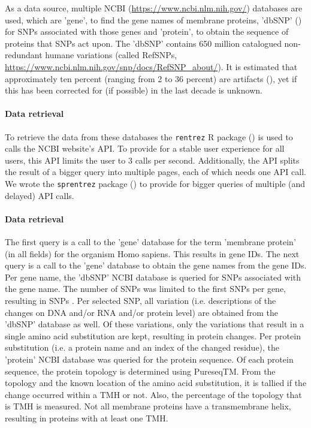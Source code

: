 As a data source, multiple
NCBI (\url{https://www.ncbi.nlm.nih.gov/}) databases are used,
which are 'gene', to find the gene names of membrane proteins, 
'dbSNP' (\cite{sherry2001dbsnp}) for SNPs associated with those genes
and 'protein', to obtain the sequence of proteins that SNPs act upon.
The 'dbSNP' contains 650 million 
catalogued non-redundant humane variations (called RefSNPs,
\url{https://www.ncbi.nlm.nih.gov/snp/docs/RefSNP_about/}).
It is estimated that approximately ten percent (ranging from 2 to 36 percent) 
are artifacts (\cite{carlson2003additional, cutler2001high, gabriel2002structure, mitchell2004discrepancies, musumeci2010single, reich2003quality}),
yet if this has been corrected for (if possible) in the last decade is unknown.

\paragraph{Data retrieval}

To retrieve the data from these databases the
\verb;rentrez; R package (\cite{rentrez}) is used
to calls the NCBI website's API. To provide for a 
stable user experience for all users, 
this API limits the user to 3 calls per second.
Additionally, the API splits the result of a bigger
query into multiple pages, each of which needs one API call.
We wrote the \verb;sprentrez; package (\cite{sprentrez}) to provide for 
bigger queries of multiple (and delayed) API calls.

\paragraph{Data retrieval}

The first query is a call to the 'gene' database for the 
term 'membrane protein' (in all fields) for the organism Homo sapiens.
This results in  gene IDs.
The next query is a call to the 'gene' database 
to obtain the gene names from the gene IDs.
Per gene name, the 'dbSNP' NCBI database is queried for 
SNPs associated with the gene name. The number of SNPs
was limited to the first  SNPs per gene,
resulting in  SNPs 
.
Per selected SNP, all variation (i.e. descriptions of the changes on DNA
and/or RNA and/or protein level) are obtained from the 'dbSNP' database
as well. Of these variations, only the variations that result in a single
amino acid substitution are kept, resulting in  protein changes.
Per protein substitution (i.e. a protein name and an index of the changed residue), 
the 'protein' NCBI database was queried for the
protein sequence.
Of each protein sequence, the protein topology is determined 
using PureseqTM.
From the topology and the known location of the amino acid substitution, 
it is tallied if the change occurred within a TMH or not.
Also, the percentage of the topology that is TMH is measured.
Not all membrane proteins have a transmembrane helix, resulting
in  proteins with at least one TMH. 



